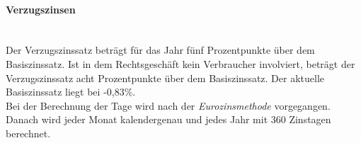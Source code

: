 	\paragraph{Verzugszinsen} ~\\Der Verzugszinssatz beträgt für das Jahr fünf Prozentpunkte über dem Basiszinssatz. Ist in dem Rechtsgeschäft kein Verbraucher involviert, beträgt der Verzugszinssatz acht Prozentpunkte über dem Basiszinssatz. Der aktuelle Basiszinssatz liegt bei -0,83\%.\\
	Bei der Berechnung der Tage wird nach der \textit{Eurozinsmethode} vorgegangen. Danach wird jeder Monat kalendergenau und jedes Jahr mit 360 Zinstagen berechnet.